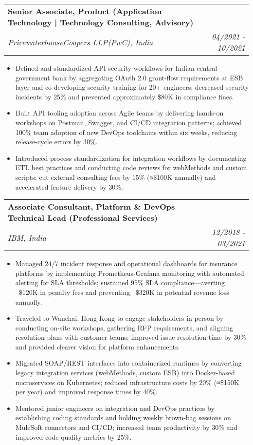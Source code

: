 \documentclass[letterpaper,11pt]{article}
\makeatletter
\newcommand{\resumeItem}[1]{
  \item\small{
    {#1 \vspace{-1pt}}
  }
}
\newcommand{\resumeSubheading}[4]{
  \vspace{-2pt}\item
    \begin{tabular*}{1.0\textwidth}[t]{l@{\extracolsep{\fill}}r}
      \textbf{\large#1} & \textbf{\small #2} \\
      \textit{\large#3} & \textit{\small #4} \\
      
    \end{tabular*}\vspace{-7pt}
}
\newcommand{\resumeItemListStart}{\begin{itemize}[leftmargin=0.1in]}
\newcommand{\resumeItemListEnd}{\end{itemize}\vspace{-5pt}}
\makeatother
\begin{document}
    \resumeSubheading
      {Senior Associate, Product (Application Technology | Technology Consulting, Advisory)}{} 
      {PricewaterhouseCoopers LLP(PwC), India}{04/2021 - 10/2021}
      \resumeItemListStart
            \resumeItem{\normalsize{Defined and standardized API security workflows for Indian central government bank by aggregating OAuth 2.0 grant-flow requirements at ESB layer and co-developing security training for 20+ engineers; decreased security incidents by 25\% and prevented approximately \$80K in compliance fines.}}
            \resumeItem{\normalsize{Built API tooling adoption across Agile teams by delivering hands-on workshops on Postman, Swagger, and CI/CD integration patterns; achieved 100\% team adoption of new DevOps toolchains within six weeks, reducing release-cycle errors by 30\%.}}  
            \resumeItem{\normalsize{Introduced process standardization for integration workflows by documenting ETL best practices and conducting code reviews for webMethods and custom scripts; cut external consulting fees by 15\% (≈\$100K annually) and accelerated feature delivery by 30\%.}}  
      \resumeItemListEnd  

    \resumeSubheading
      {Associate Consultant, Platform \& DevOps Technical Lead (Professional Services)}{} 
      {IBM, India}{12/2018 - 03/2021}
      \resumeItemListStart
            \resumeItem{\normalsize{Managed 24/7 incident response and operational dashboards for insurance platforms by implementing Prometheus-Grafana monitoring with automated alerting for SLA thresholds; sustained 95\% SLA compliance—averting ~\$120K in penalty fees and preventing ~\$320K in potential revenue loss annually.}}
            \resumeItem{\normalsize{Traveled to Wanchai, Hong Kong to engage stakeholders in person by conducting on-site workshops, gathering RFP requirements, and aligning resolution plans with customer teams; improved issue-resolution time by 30\% and provided clearer vision for platform enhancements.}}  
            \resumeItem{\normalsize{Migrated SOAP/REST interfaces into containerized runtimes by converting legacy integration services (webMethods, custom ESB) into Docker-based microservices on Kubernetes; reduced infrastructure costs by 20\% (≈\$150K per year) and improved response times by 40\%.}}
            \resumeItem{\normalsize{Mentored junior engineers on integration and DevOps practices by establishing coding standards and holding weekly brown-bag sessions on MuleSoft connectors and CI/CD; increased team productivity by 30\% and improved code-quality metrics by 25\%.}}  
      \resumeItemListEnd  
\end{document}
